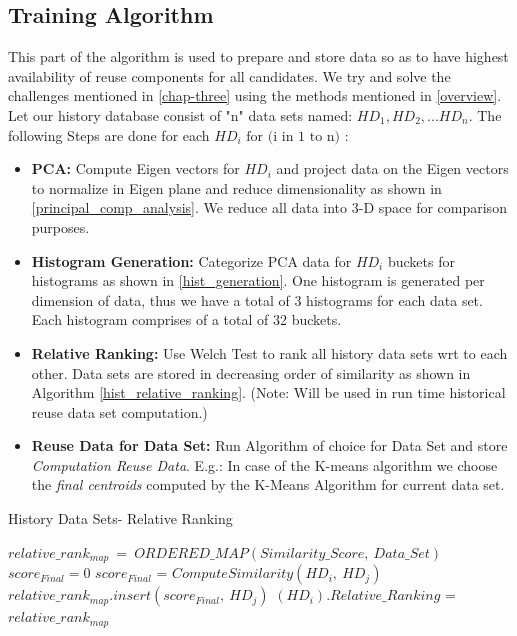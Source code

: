 \documentclass{vldb}
\begin{document}
\subsection{Training Algorithm}
This part of the algorithm is used to prepare and store data so as to have highest availability of reuse components for all candidates. We try and solve the challenges mentioned in \ref{chap-three} using the methods mentioned in \ref{overview}. 
Let our history database consist of "n" data sets named: $HD_1, HD_2, ... HD_n$.
The following Steps are done for each $HD_i \text{  for (i in 1 to n) } $:
\begin{itemize}
    \item \label{pca_gen_training} \textbf{PCA:} Compute Eigen vectors for $HD_i$ and project data on the Eigen vectors to normalize in Eigen plane and reduce dimensionality as shown in \ref{principal_comp_analysis}. We reduce all data into 3-D space for comparison purposes.
    \item \label{his_gen_training} \textbf{Histogram Generation:} Categorize PCA data for $HD_i$ buckets for histograms as shown in \ref{hist_generation}. One histogram is generated per dimension of data, thus we have a total of 3 histograms for each data set. Each histogram comprises of a total of 32 buckets. 
    \item \textbf{Relative Ranking:} Use Welch Test to rank all history data sets wrt to each other. Data sets are stored in decreasing order of similarity as shown in Algorithm \ref{hist_relative_ranking}. (Note: Will be used in run time historical reuse data set computation.)
    \item \textbf{Reuse Data for Data Set:} Run Algorithm of choice for Data Set and store \textit{Computation Reuse Data}. E.g.: In case of the K-means algorithm we choose the \textit{final centroids} computed by the K-Means Algorithm for current data set.
\end{itemize}

\begin{algorithm}
\caption{History Data Sets- Relative Ranking}
\label{hist_relative_ranking}
\begin{algorithmic}[1]
\State $relative\_rank_{map}\ =\ ORDERED\_MAP(Similarity\_Score,\ Data\_Set)$
\State $score_{Final} = 0$
		\State $score_{Final}$ = $ComputeSimilarity(HD_i,\ HD_j)$
		\State $relative\_rank_{map}.insert(score_{Final},\ HD_j)$
	\EndFor
	\State$(HD_i).Relative\_Ranking$ = $relative\_rank_{map}$
\EndFor
\EndProcedure
\end{algorithmic}
\end{algorithm}
\end{document}
